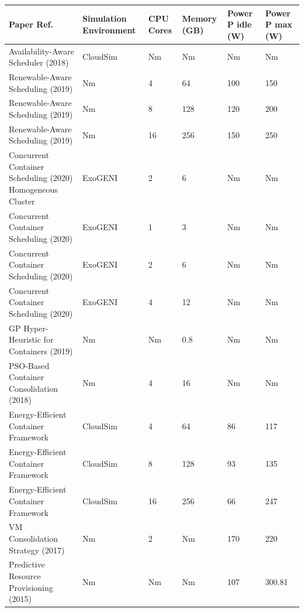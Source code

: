 \begin{table}[H]
\centering
\footnotesize
\begin{tabular}{|p{3.8cm}|p{2.2cm}|p{1.2cm}|p{1.5cm}|p{1.8cm}|p{1.8cm}|}
\hline
\textbf{Paper Ref.} & \textbf{Simulation Environment} & \textbf{CPU Cores} & \textbf{Memory (GB)} & \textbf{Power P idle (W)} & \textbf{Power P max (W)} \\
\hline
Availability-Aware Scheduler \cite{alahmad_availability-aware_2018} (2018) & CloudSim & Nm & Nm & Nm & Nm \\
\hline
Renewable-Aware Scheduling \cite{kumar_renewable_2019} (2019) & Nm & 4 & 64 & 100 & 150 \\
\hline
Renewable-Aware Scheduling \cite{kumar_renewable_2019} (2019) & Nm & 8 & 128 & 120 & 200 \\
\hline
Renewable-Aware Scheduling \cite{kumar_renewable_2019} (2019) & Nm & 16 & 256 & 150 & 250 \\
\hline
Concurrent Container Scheduling \cite{hu_concurrent_2020} (2020) Homogeneous Cluster & ExoGENI & 2 & 6 & Nm & Nm \\
\hline
Concurrent Container Scheduling \cite{hu_concurrent_2020} (2020) & ExoGENI & 1 & 3 & Nm & Nm \\
\hline
Concurrent Container Scheduling \cite{hu_concurrent_2020} (2020) & ExoGENI & 2 & 6 & Nm & Nm \\
\hline
Concurrent Container Scheduling \cite{hu_concurrent_2020} (2020) & ExoGENI & 4 & 12 & Nm & Nm \\
\hline
GP Hyper-Heuristic for Containers \cite{tan_hybrid_2019} (2019) & Nm & Nm & 0.8 & Nm & Nm \\
\hline
PSO-Based Container Consolidation \cite{shi_energy-aware_2018} (2018) & Nm & 4 & 16 & Nm & Nm \\
\hline
Energy-Efficient Container Framework \cite{piraghaj_framework_2015} & CloudSim & 4 & 64 & 86 & 117 \\
\hline
Energy-Efficient Container Framework \cite{piraghaj_framework_2015} & CloudSim & 8 & 128 & 93 & 135 \\
\hline
Energy-Efficient Container Framework \cite{piraghaj_framework_2015} & CloudSim & 16 & 256 & 66 & 247 \\
\hline
VM Consolidation Strategy \cite{carrega_energy-aware_2017} (2017) & Nm & 2 & Nm & 170 & 220 \\
\hline
Predictive Resource Provisioning \cite{dabbagh_energy-efficient_2015} (2015) & Nm & Nm & Nm & 107 & 300.81 \\
\hline

\end{tabular}
\end{table}

